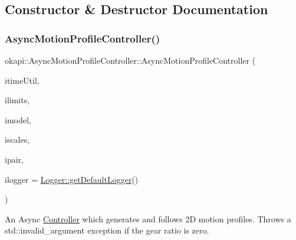 \subsection{Constructor \& Destructor Documentation}
\mbox{\label{classokapi_1_1AsyncMotionProfileController_a7552d4d18213b79ec0fc0e65a3294305}} 
\subsubsection{\texorpdfstring{AsyncMotionProfileController()}{AsyncMotionProfileController()}\hspace{0.1cm}{\footnotesize\ttfamily [1/2]}}
{\footnotesize\ttfamily okapi\+::\+Async\+Motion\+Profile\+Controller\+::\+Async\+Motion\+Profile\+Controller (\begin{DoxyParamCaption}\item[{const \mbox{\hyperlink{classokapi_1_1TimeUtil}{Time\+Util}} \&}]{itime\+Util,  }\item[{const \mbox{\hyperlink{structokapi_1_1PathfinderLimits}{Pathfinder\+Limits}} \&}]{ilimits,  }\item[{const std\+::shared\+\_\+ptr$<$ \mbox{\hyperlink{classokapi_1_1ChassisModel}{Chassis\+Model}} $>$ \&}]{imodel,  }\item[{const \mbox{\hyperlink{classokapi_1_1ChassisScales}{Chassis\+Scales}} \&}]{iscales,  }\item[{const \mbox{\hyperlink{structokapi_1_1AbstractMotor_1_1GearsetRatioPair}{Abstract\+Motor\+::\+Gearset\+Ratio\+Pair}} \&}]{ipair,  }\item[{const std\+::shared\+\_\+ptr$<$ \mbox{\hyperlink{classokapi_1_1Logger}{Logger}} $>$ \&}]{ilogger = {\ttfamily \mbox{\hyperlink{classokapi_1_1Logger_a5053cf778b4b55acba788a3797dc96d2}{Logger\+::get\+Default\+Logger}}()} }\end{DoxyParamCaption})}

An Async \mbox{\hyperlink{classokapi_1_1Controller}{Controller}} which generates and follows 2D motion profiles. Throws a {\ttfamily std\+::invalid\+\_\+argument} exception if the gear ratio is zero.


